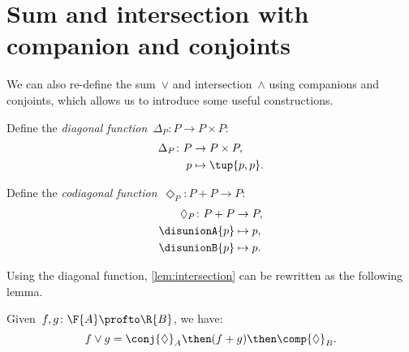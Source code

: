 

\section{Sum and intersection with companion and conjoints}

We can also re-define the sum~$\vee$ and intersection~$\wedge$ using companions and conjoints, which allows us to introduce some useful constructions.

\begin{definition}
    Define the \emph{diagonal function}~$\Delta_P\colon P \to P \times P$:
    \begin{equation}
        \begin{aligned}
            \Delta_P \colon P & \to P \times P, \\
            p & \mapsto \tup{p, p}.
        \end{aligned}
    \end{equation}
\end{definition}

\begin{definition}
    Define the \emph{codiagonal function}~$\Diamond_P\colon P+P \to P $:
    \begin{equation}
        \begin{aligned}
            \Diamond_P \colon P + P & \to P,  \\
            \disunionA{p} & \mapsto p, \\
            \disunionB{p} & \mapsto p.
        \end{aligned}
    \end{equation}
\end{definition}

\noindent Using the diagonal function, \cref{lem:intersection} can be rewritten as the following lemma.

\begin{lemma}
    Given~$f, g\colon \F{A} \profto \R{B}$, we have:
    \begin{equation}
        f \vee g =  \conj{\Diamond}_A \then (f + g)\then \comp{\Diamond}_B.
    \end{equation}
\end{lemma}

